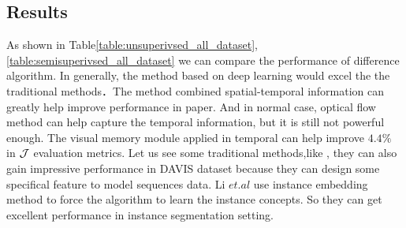 \subsection{Results}
As shown in Table\ref{table:unsuperivsed_all_dataset},\ref{table:semisuperivsed_all_dataset} we can compare the performance of difference algorithm. In generally, the method based on deep learning would excel the the traditional 
methods．The method combined spatial-temporal information can greatly help improve performance in paper\cite{Tokmakov2017Learning}. And in normal case, optical flow method can help capture the 
temporal information, but it is still not powerful enough. The visual memory module applied in temporal can help improve $4.4\%$ in $\mathcal{J}$ evaluation metrics. Let us see some traditional methods,like
\cite{Koh2017Primary,li2018instance}, they can also gain impressive performance in DAVIS dataset because they can design some specifical feature to model sequences data. Li $et.al$ use instance embedding method
to force the algorithm to learn the instance concepts. So they can get excellent performance in instance segmentation setting.


